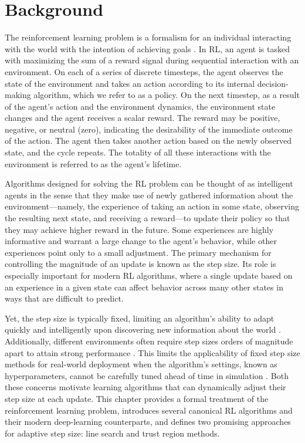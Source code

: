 \chapter{Background} \label{sec: background}
The reinforcement learning problem is a formalism for an individual interacting with the world with the intention of achieving goals \cite{sutton}. In RL, an agent is tasked with maximizing the sum of a reward signal during sequential interaction with an environment. On each of a series of discrete timesteps, the agent observes the state of the environment and takes an action according to its internal decision-making algorithm, which we refer to as a policy. On the next timestep, as a result of the agent's action and the environment dynamics, the environment state changes and the agent receives a scalar reward. The reward may be positive, negative, or neutral (zero), indicating the desirability of the immediate outcome of the action. The agent then takes another action based on the newly observed state, and the cycle repeats. The totality of all these interactions with the environment is referred to as the agent's lifetime. 

Algorithms designed for solving the RL problem can be thought of as intelligent agents in the sense that they make use of newly gathered information about the environment—namely, the experience of taking an action in some state, observing the resulting next state, and receiving a reward—to update their policy so that they may achieve higher reward in the future. Some experiences are highly informative and warrant a large change to the agent's behavior, while other experiences point only to a small adjustment. The primary mechanism for controlling the magnitude of an update is known as the step size. Its role is especially important for modern RL algorithms, where a single update based on an experience in a given state can affect behavior across many other states in ways that are difficult to predict. 

Yet, the step size is typically fixed, limiting an algorithm's ability to adapt quickly and intelligently upon discovering new information about the world . Additionally, different environments often require step sizes orders of magnitude apart to attain strong performance . This limits the applicability of fixed step size methods for real-world deployment when the algorithm's settings, known as hyperparameters, cannot be carefully tuned ahead of time in simulation . Both these concerns motivate learning algorithms that can dynamically adjust their step size at each update. This chapter provides a formal treatment of the reinforcement learning problem, introduces several canonical RL algorithms and their modern deep-learning counterparts, and defines two promising approaches for adaptive step size: line search and trust region methods.

